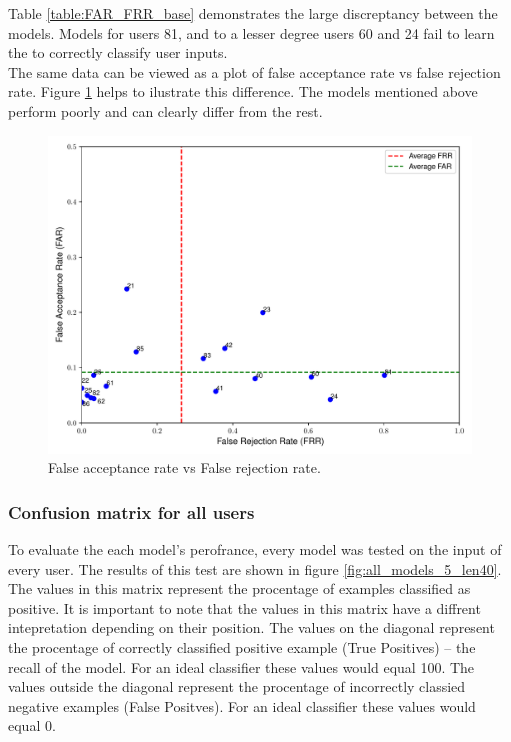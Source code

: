 Table \ref{table:FAR_FRR_base} demonstrates the large discreptancy between the models. Models for users 81, and to a lesser degree users 60 and 24 fail to learn the to correctly classify user inputs. \\
The same data can be viewed as a plot of false acceptance rate vs false rejection rate. 
Figure \ref{fig:frr_vs_far_all_models_base} helps to ilustrate this difference. The models mentioned above perform poorly and can clearly differ from the rest. 

\begin{figure}[H]
	\centering
	
	\includegraphics[width=\textwidth]{images/far_vs_frr.pdf} %
	\caption{False acceptance rate vs False rejection rate.}
	\label{fig:frr_vs_far_all_models_base}
\end{figure}

\subsubsection{Confusion matrix for all users}
To evaluate the each model's perofrance, every model was tested on the input of every user. The results of this test are shown in figure \ref{fig:all_models_5_len40}. The values in this matrix represent the procentage of examples classified as positive. It is important to note that the values in this matrix have a diffrent intepretation depending on their position. The values on the diagonal represent the procentage of correctly classified positive example (True Positives) -- the recall of the model. For an ideal classifier these values would equal 100. The values outside the diagonal represent the procentage of incorrectly classied negative examples (False Positves). For an ideal classifier these values would equal 0.

